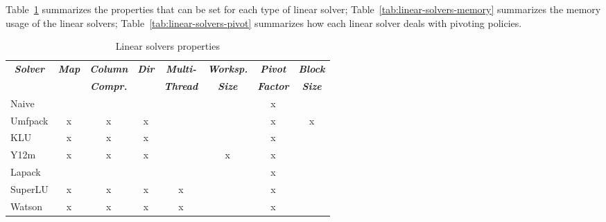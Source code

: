 Table~\ref{tab:linear-solvers-props} summarizes the properties that can be set
for each type of linear solver; Table~\ref{tab:linear-solvers-memory}
summarizes  the memory usage of the linear solvers;
Table~\ref{tab:linear-solvers-pivot}
summarizes how each linear solver deals with pivoting policies.

\begin{table}
\centering
\caption{Linear solvers properties}\label{tab:linear-solvers-props}
\begin{tabular}{lccccccc}
\hline
	\multicolumn{1}{c}{\textbf{\emph{Solver}}} &
	\multicolumn{1}{c}{\textbf{\emph{Map}}} &
	\multicolumn{1}{c}{\textbf{\emph{Column}}} &
	\multicolumn{1}{c}{\textbf{\emph{Dir}}} &
	\multicolumn{1}{c}{\textbf{\emph{Multi-}}} &
	\multicolumn{1}{c}{\textbf{\emph{Worksp.}}} &
	\multicolumn{1}{c}{\textbf{\emph{Pivot}}} &
	\multicolumn{1}{c}{\textbf{\emph{Block}}} \\
	& & \multicolumn{1}{c}{\textbf{\emph{Compr.}}} &
	& \multicolumn{1}{c}{\textbf{\emph{Thread}}}
	& \multicolumn{1}{c}{\textbf{\emph{Size}}}
	& \multicolumn{1}{c}{\textbf{\emph{Factor}}}
	& \multicolumn{1}{c}{\textbf{\emph{Size}}} \\
\hline\hline
	Naive		& 	&	&	&	&	& x	&	\\
	Umfpack		& x	& x	& x	&	&	& x	& x	\\
	KLU		& x	& x	& x	&	&	& x	&	\\
	Y12m		& x	& x	& x	&	& x	& x	&	\\
	Lapack		&	&	&	&	&	& x	&	\\
	SuperLU		& x	& x	& x	& x	&	& x	&	\\
	Watson		& x	& x	& x	& x	&	& x	&	\\
\hline
\end{tabular}
\end{table}

